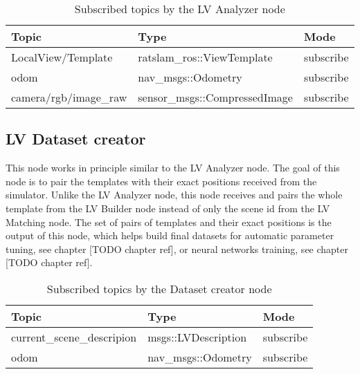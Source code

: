 \begin{table}[htpb]
    \caption{Subscribed  topics by the LV Analyzer node}\label{tab:lvAnalTopics}
    \centering
    \begin{tabular}{l l l}
        \toprule
        Topic                 & Type                          & Mode      \\
        \midrule
        LocalView/Template    & ratslam\_ros::ViewTemplate    & subscribe \\
        odom                  & nav\_msgs::Odometry           & subscribe \\
        camera/rgb/image\_raw & sensor\_msgs::CompressedImage & subscribe \\
        \bottomrule
    \end{tabular}
\end{table}

\subsection{LV Dataset creator}

This node works in principle similar to the LV Analyzer node. The goal of this node is to pair the templates with their exact positions received from the simulator. Unlike the LV Analyzer node, this node receives and pairs the whole template from the LV Builder node instead of only the scene id from the LV Matching node. The set of pairs of templates and their exact positions is the output of this node, which helps build final datasets for automatic parameter tuning, see chapter [TODO chapter ref], or neural networks training, see chapter [TODO chapter ref].


\begin{table}[htpb]
    \caption{Subscribed  topics by the Dataset creator node}\label{tab:datasetCreatorTopics}
    \centering
    \begin{tabular}{l l l}
        \toprule
        Topic                      & Type                & Mode      \\
        \midrule
        current\_scene\_descripion & msgs::LVDescription & subscribe \\
        odom                       & nav\_msgs::Odometry & subscribe \\
        \bottomrule
    \end{tabular}
\end{table}